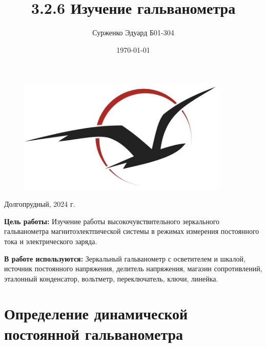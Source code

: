 \documentclass[a4paper,12pt]{article} %
\date{\today}
\begin{document}
\begin{titlepage}
\centering    

\begin{figure}[t]
\centering
\includegraphics[width=100mm]{frtk-label 2.jpg}
\label{frkt-label.jpg}
\end{figure}




\author{Сурженко Эдуард Б01-304}
\title{3.2.6 Изучение гальванометра}
\date{}
\maketitle
\vfill
	Долгопрудный, 2024 г.
\thispagestyle{empty}
\end{titlepage}
\textbf{Цель работы:} 
Изучение работы высокочувствительного зеркального гальванометра магнитоэлектпической системы в режимах измерения постоянного тока и электрического заряда.

\textbf{В работе используются:}
Зеркальный гальванометр с осветителем и шкалой, источник постоянного напряжения, делитель напряжения, магазин сопротивлений, эталонный конденсатор, вольтметр, переключатель, ключи, линейка.

\section{Определение динамической постоянной гальванометра}
\end{document}
